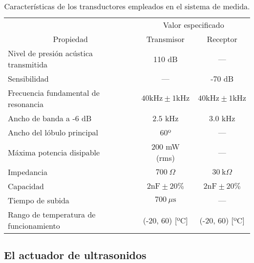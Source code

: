 \begin{sidewaystable}
	\centering
	\begin{threeparttable}
	\begin{tabular}{l c c}
		\toprule
		& \multicolumn{2}{c}{Valor especificado\tnote{*}} \\
		\cmidrule(l){2-3}
		\multicolumn{1}{c}{Propiedad} & Transmisor & Receptor \\
		\midrule
		Nivel de presión acústica transmitida & 110 dB & --- \\
		Sensibilidad & --- & -70 dB \\
		Frecuencia fundamental de resonancia
		& $40 \text{kHz} \pm 1 \text{kHz}$
		& $40 \text{kHz} \pm 1 \text{kHz}$ \\
		Ancho de banda a -6 dB & $2.5$ kHz & $3.0$ kHz \\
		Ancho del lóbulo principal & 60º & --- \\
		Máxima potencia disipable & 200 mW (rms) & --- \\
		Impedancia & $700\ \Omega$ & $30\ \text{k}\Omega$ \\
		Capacidad & $2 \text{nF} \pm 20\%$
		& $2 \text{nF} \pm 20\%$ \\
		Tiempo de subida & $700\ \mu\text{s}$ & --- \\
		Rango de temperatura de funcionamiento %
		& (-20, 60) [ºC] & (-20, 60) [ºC] \\
		\bottomrule
	\end{tabular}
	\begin{TableNotes}
	\end{TableNotes}
	\end{threeparttable}
	\caption[Características de los transductores]{Características de
	los transductores empleados en el sistema de medida.}
	\label{tab:transducers}
\end{sidewaystable}


\subsection{El actuador de ultrasonidos}


